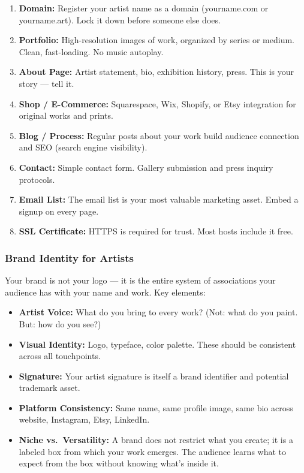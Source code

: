 \documentclass[11pt,letterpaper]{article}
\begin{document}
\begin{enumerate}[noitemsep, leftmargin=2em]
  \item \textbf{Domain:} Register your artist name as a domain (yourname.com or yourname.art). Lock it down before someone else does.
  \item \textbf{Portfolio:} High-resolution images of work, organized by series or medium. Clean, fast-loading. No music autoplay.
  \item \textbf{About Page:} Artist statement, bio, exhibition history, press. This is your story --- tell it.
  \item \textbf{Shop / E-Commerce:} Squarespace, Wix, Shopify, or Etsy integration for original works and prints.
  \item \textbf{Blog / Process:} Regular posts about your work build audience connection and SEO (search engine visibility).
  \item \textbf{Contact:} Simple contact form. Gallery submission and press inquiry protocols.
  \item \textbf{Email List:} The email list is your most valuable marketing asset. Embed a signup on every page.
  \item \textbf{SSL Certificate:} HTTPS is required for trust. Most hosts include it free.
\end{enumerate}

\subsubsection{Brand Identity for Artists}

Your brand is not your logo --- it is the entire system of associations your audience has with your name and work. Key elements:

\begin{itemize}[noitemsep]
  \item \textbf{Artist Voice:} What do you bring to every work? (Not: what do you paint. But: how do you see?)
  \item \textbf{Visual Identity:} Logo, typeface, color palette. These should be consistent across all touchpoints.
  \item \textbf{Signature:} Your artist signature is itself a brand identifier and potential trademark asset.
  \item \textbf{Platform Consistency:} Same name, same profile image, same bio across website, Instagram, Etsy, LinkedIn.
  \item \textbf{Niche vs.\ Versatility:} A brand does not restrict what you create; it is a labeled box from which your work emerges. The audience learns what to expect from the box without knowing what's inside it.
\end{itemize}
\end{document}
